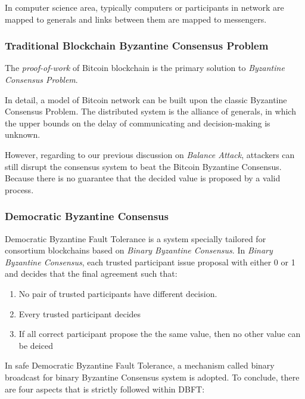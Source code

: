 \documentclass[12pt]{article}
\begin{document}
In computer science area, typically computers or participants in network are mapped to generals and links between them are mapped to messengers.

\subsubsection{Traditional Blockchain Byzantine Consensus Problem}

The \textit{proof-of-work} of Bitcoin blockchain is the primary solution to \textit{Byzantine Consensus Problem}. 

In detail, a model of Bitcoin network can be built upon the classic Byzantine Consensus Problem. The distributed system is the alliance of generals, in which the upper bounds on the delay of communicating and decision-making is unknown. 

However, regarding to our previous discussion on \textit{Balance Attack}, attackers can still disrupt the consensus system to beat the Bitcoin Byzantine Consensus\cite{gramoli2017blockchain}. Because there is no guarantee that the decided value is proposed by a valid process.

\subsubsection{Democratic Byzantine Consensus}

Democratic Byzantine Fault Tolerance is a system specially tailored for consortium blockchains based on \textit{Binary Byzantine Consensus}. In \textit{Binary Byzantine Consensus}\cite{mostefaoui2015signature}, each trusted participant issue proposal with either 0 or 1 and decides that the final agreement such that:

\begin{enumerate}
    \item No pair of trusted participants have different decision.
    \item Every trusted participant decides
    \item If all correct participant propose the the same value, then no other value can be deiced
\end{enumerate}

In safe Democratic Byzantine Fault Tolerance\cite{DBLP:journals/corr/CrainGLR17}, a mechanism called binary broadcast for binary Byzantine Consensus system is adopted. To conclude, there are four aspects that is strictly followed within DBFT:
\end{document}
